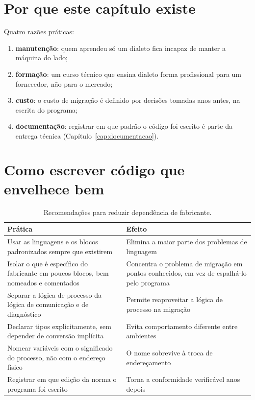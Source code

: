 \section{Por que este capítulo existe}

Quatro razões práticas:

\begin{enumerate}
  \item \textbf{manutenção}: quem aprendeu só um dialeto fica incapaz de manter a máquina do lado;
  \item \textbf{formação}: um curso técnico que ensina dialeto forma profissional para um fornecedor,
        não para o mercado;
  \item \textbf{custo}: o custo de migração é definido por decisões tomadas anos antes, na escrita do
        programa;
  \item \textbf{documentação}: registrar em que padrão o código foi escrito é parte da entrega
        técnica (Capítulo~\ref{cap:documentacao}).
\end{enumerate}

\section{Como escrever código que envelhece bem}

\begin{table}[H]
  \centering
  \caption{Recomendações para reduzir dependência de fabricante.}
  \label{tab:recomendacoes-portabilidade}
  \begin{tabular}{p{6.0cm} p{8.6cm}}
    \toprule
    Prática & Efeito \\
    \midrule
    Usar as linguagens e os blocos padronizados sempre que existirem
      & Elimina a maior parte dos problemas de linguagem \\
    Isolar o que é específico do fabricante em poucos blocos, bem nomeados e comentados
      & Concentra o problema de migração em pontos conhecidos, em vez de espalhá-lo pelo programa \\
    Separar a lógica de processo da lógica de comunicação e de diagnóstico
      & Permite reaproveitar a lógica de processo na migração \\
    Declarar tipos explicitamente, sem depender de conversão implícita
      & Evita comportamento diferente entre ambientes \\
    Nomear variáveis com o significado do processo, não com o endereço físico
      & O nome sobrevive à troca de endereçamento \\
    Registrar em que edição da norma o programa foi escrito
      & Torna a conformidade verificável anos depois \\
    \bottomrule
  \end{tabular}
\end{table}

